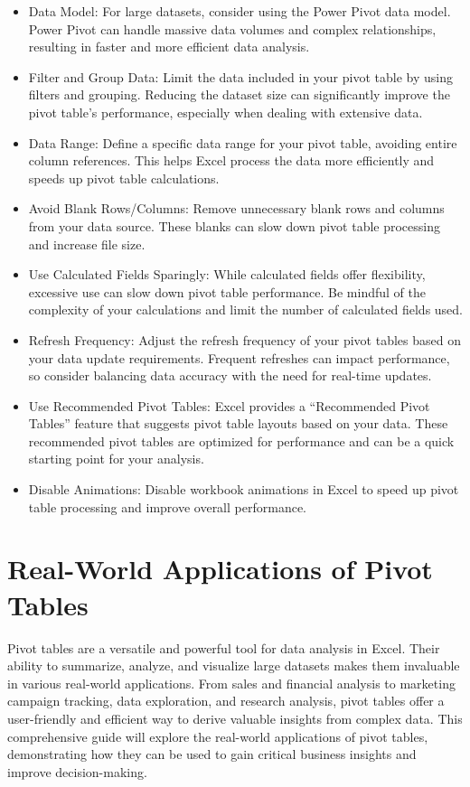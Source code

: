 \documentclass[
]{book}
\begin{document}
\begin{itemize}
\item
  Data Model: For large datasets, consider using the Power Pivot data model. Power Pivot can handle massive data volumes and complex relationships, resulting in faster and more efficient data analysis.
\item
  Filter and Group Data: Limit the data included in your pivot table by using filters and grouping. Reducing the dataset size can significantly improve the pivot table's performance, especially when dealing with extensive data.
\item
  Data Range: Define a specific data range for your pivot table, avoiding entire column references. This helps Excel process the data more efficiently and speeds up pivot table calculations.
\item
  Avoid Blank Rows/Columns: Remove unnecessary blank rows and columns from your data source. These blanks can slow down pivot table processing and increase file size.
\item
  Use Calculated Fields Sparingly: While calculated fields offer flexibility, excessive use can slow down pivot table performance. Be mindful of the complexity of your calculations and limit the number of calculated fields used.
\item
  Refresh Frequency: Adjust the refresh frequency of your pivot tables based on your data update requirements. Frequent refreshes can impact performance, so consider balancing data accuracy with the need for real-time updates.
\item
  Use Recommended Pivot Tables: Excel provides a ``Recommended Pivot Tables'' feature that suggests pivot table layouts based on your data. These recommended pivot tables are optimized for performance and can be a quick starting point for your analysis.
\item
  Disable Animations: Disable workbook animations in Excel to speed up pivot table processing and improve overall performance.
\end{itemize}

\hypertarget{real-world-applications-of-pivot-tables}{%
\chapter{Real-World Applications of Pivot Tables}\label{real-world-applications-of-pivot-tables}}

Pivot tables are a versatile and powerful tool for data analysis in Excel. Their ability to summarize, analyze, and visualize large datasets makes them invaluable in various real-world applications. From sales and financial analysis to marketing campaign tracking, data exploration, and research analysis, pivot tables offer a user-friendly and efficient way to derive valuable insights from complex data. This comprehensive guide will explore the real-world applications of pivot tables, demonstrating how they can be used to gain critical business insights and improve decision-making.
\end{document}
